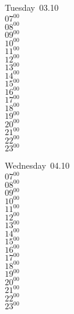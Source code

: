 \documentclass[11pt, a4paper]{book}\usepackage[]{graphicx}\usepackage[]{color}
\begin{document}
\begin{weekdaybox}
  Tuesday~03.10\\
  { 
  \vfill
  $07^{00}$\\
$08^{00}$\\
$09^{00}$\\
$10^{00}$\\
$11^{00}$\\
$12^{00}$\\
$13^{00}$\\
$14^{00}$\\
$15^{00}$\\
$16^{00}$\\
$17^{00}$\\
$18^{00}$\\
$19^{00}$\\
$20^{00}$\\
$21^{00}$\\
$22^{00}$\\
$23^{00}$\\
  }
\end{weekdaybox}
\begin{weekdaybox}
  Wednesday~04.10\\
  { 
  \vfill
  $07^{00}$\\
$08^{00}$\\
$09^{00}$\\
$10^{00}$\\
$11^{00}$\\
$12^{00}$\\
$13^{00}$\\
$14^{00}$\\
$15^{00}$\\
$16^{00}$\\
$17^{00}$\\
$18^{00}$\\
$19^{00}$\\
$20^{00}$\\
$21^{00}$\\
$22^{00}$\\
$23^{00}$\\
  }
\end{weekdaybox}
\clearpage
\begin{headerbox}
\end{headerbox}
\end{document}
